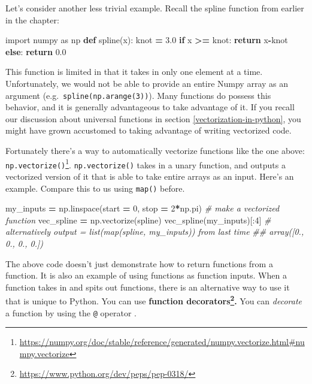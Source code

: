 \documentclass[
  12pt,
  krantz2]{krantz}
\makeatletter
\newenvironment{Shaded}{\begin{snugshade}}{\end{snugshade}}
\newcommand{\CommentTok}[1]{\textcolor[rgb]{0.37,0.37,0.37}{\textit{#1}}}
\newcommand{\ControlFlowTok}[1]{\textcolor[rgb]{0.27,0.27,0.27}{\textbf{#1}}}
\newcommand{\DecValTok}[1]{\textcolor[rgb]{0.06,0.06,0.06}{#1}}
\newcommand{\FloatTok}[1]{\textcolor[rgb]{0.06,0.06,0.06}{#1}}
\newcommand{\ImportTok}[1]{#1}
\newcommand{\KeywordTok}[1]{\textcolor[rgb]{0.27,0.27,0.27}{\textbf{#1}}}
\newcommand{\NormalTok}[1]{#1}
\newcommand{\OperatorTok}[1]{\textcolor[rgb]{0.43,0.43,0.43}{\textbf{#1}}}
\renewcommand{\href}[2]{#2\footnote{\url{#1}}}
\newenvironment{kframe}{%
\medskip{}
\setlength{\fboxsep}{.8em}
 \def\at@end@of@kframe{}%
 \ifinner\ifhmode%
  \def\at@end@of@kframe{\end{minipage}}%
  \begin{minipage}{\columnwidth}%
 \fi\fi%
 \def\FrameCommand##1{\hskip\@totalleftmargin \hskip-\fboxsep
 \colorbox{shadecolor}{##1}\hskip-\fboxsep
     \hskip-\linewidth \hskip-\@totalleftmargin \hskip\columnwidth}%
 \MakeFramed {\advance\hsize-\width
   \@totalleftmargin\z@ \linewidth\hsize
   \@setminipage}}%
 {\par\unskip\endMakeFramed%
 \at@end@of@kframe}
\renewenvironment{Shaded}{\begin{kframe}}{\end{kframe}}
\makeatother
\begin{document}
Let's consider another less trivial example. Recall the spline function from earlier in the chapter:

\begin{Shaded}
\begin{Highlighting}[]
\ImportTok{import}\NormalTok{ numpy }\ImportTok{as}\NormalTok{ np}
\KeywordTok{def}\NormalTok{ spline(x):}
\NormalTok{    knot }\OperatorTok{=} \FloatTok{3.0}
    \ControlFlowTok{if}\NormalTok{ x }\OperatorTok{\textgreater{}=}\NormalTok{ knot:}
        \ControlFlowTok{return}\NormalTok{ x}\OperatorTok{{-}}\NormalTok{knot}
    \ControlFlowTok{else}\NormalTok{:}
        \ControlFlowTok{return} \FloatTok{0.0}
\end{Highlighting}
\end{Shaded}

This function is limited in that it takes in only one element at a time. Unfortunately, we would not be able to provide an entire Numpy array as an argument (e.g.~\texttt{spline(np.arange(3))}). Many functions do possess this behavior, and it is generally advantageous to take advantage of it. If you recall our discussion about universal functions in section \ref{vectorization-in-python}, you might have grown accustomed to taking advantage of writing vectorized code.

Fortunately there's a way to automatically vectorize functions like the one above: \href{https://numpy.org/doc/stable/reference/generated/numpy.vectorize.html\#numpy.vectorize}{\texttt{np.vectorize()}}. \texttt{np.vectorize()} takes in a unary function, and outputs a vectorized version of it that is able to take entire arrays as an input. Here's an example. Compare this to us using \texttt{map()} before.

\begin{Shaded}
\begin{Highlighting}[]
\NormalTok{my\_inputs }\OperatorTok{=}\NormalTok{ np.linspace(start }\OperatorTok{=} \DecValTok{0}\NormalTok{, stop }\OperatorTok{=} \DecValTok{2}\OperatorTok{*}\NormalTok{np.pi)}
\CommentTok{\# make a vectorized function}
\NormalTok{vec\_spline }\OperatorTok{=}\NormalTok{ np.vectorize(spline) }
\NormalTok{vec\_spline(my\_inputs)[:}\DecValTok{4}\NormalTok{]}
\CommentTok{\# alternatively output = list(map(spline, my\_inputs)) from last time}
\CommentTok{\#\# array([0., 0., 0., 0.])}
\end{Highlighting}
\end{Shaded}

The above code doesn't just demonstrate how to return functions from a function. It is also an example of using functions as function inputs. When a function takes in and spits out functions, there is an alternative way to use it that is unique to Python. You can use \textbf{\href{https://www.python.org/dev/peps/pep-0318/}{function decorators}.} You can \emph{decorate} a function by using the \texttt{@} operator \citep{Lutz13}.
\end{document}
